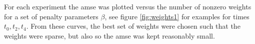 \documentclass[11pt]{article}
\begin{document}
For each experiment the amse was plotted versus the number of nonzero weights for a set of penalty parameters $\beta$, see figure \ref{fig:weights1} for examples for times $t_0,t_2,t_4$. From these curves, the best set of weights were chosen such that the weights were sparse, but also so the amse was kept reasonably small. 
\end{document}
